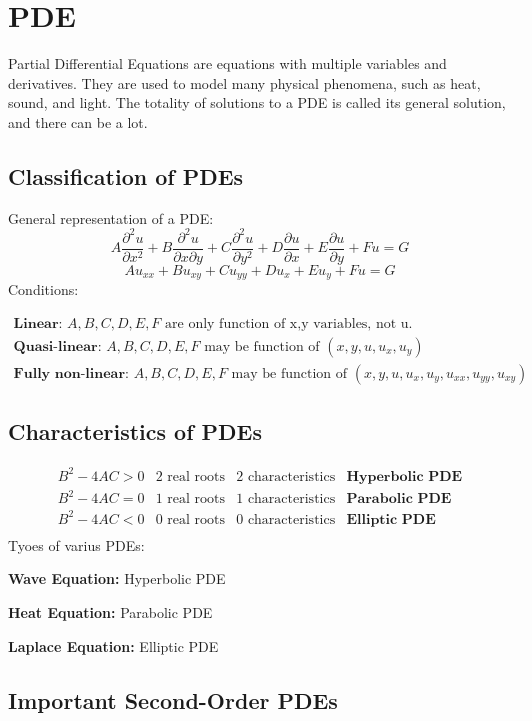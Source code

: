 \section{PDE}
Partial Differential Equations are equations with multiple variables and derivatives.
They are used to model many physical phenomena, such as heat, sound, and light.
The totality of solutions to a PDE is called its general solution, and there can be a lot.

\subsection{Classification of PDEs}
General representation of a PDE:
\[
  A\frac{\partial^2u}{\partial x^2}+B\frac{\partial^2u}{\partial x\partial y}+C\frac{\partial^2u}{\partial y^2}+D\frac{\partial u}{\partial x}+E\frac{\partial u}{\partial y}+Fu=G
\]
\[
  Au_{xx}+Bu_{xy}+Cu_{yy}+Du_x+Eu_y+Fu=G
\]
Conditions:

$$\begin{array}{l}
\textbf{Linear: }A,B,C,D,E,F \text{ are only function of x,y variables, not u.}\\
\textbf{Quasi-linear: }A,B,C,D,E,F \text{ may be function of } (x,y,u,u_x,u_y)\\
\textbf{Fully non-linear: }A,B,C,D,E,F \text{ may be function of } (x,y,u,u_x,u_y,u_{xx},u_{yy},u_{xy})
\end{array}$$

\subsection{Characteristics of PDEs}
$$\begin{array}{llll}
  B^2-4AC>0&2\text{ real roots}&2\text{ characteristics}&\textbf{Hyperbolic PDE}\\
  B^2-4AC=0&1\text{ real roots}&1\text{ characteristics}&\textbf{Parabolic PDE}\\
  B^2-4AC<0&0\text{ real roots}&0\text{ characteristics}&\textbf{Elliptic PDE}\\
\end{array}$$
Tyoes of varius PDEs:

\textbf{Wave Equation:} Hyperbolic PDE

\textbf{Heat Equation:} Parabolic PDE

\textbf{Laplace Equation:} Elliptic PDE

\subsection{Important Second-Order PDEs}

